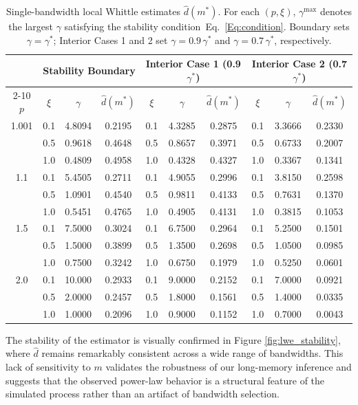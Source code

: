 \documentclass[11pt]{article}
\theoremstyle{definition}
\begin{document}
\begin{table}[t]
	\centering
	\caption{Single-bandwidth local Whittle estimates $\hat{d}(m^\ast)$.
	For each $(p,\xi)$, $\gamma^{\max}$ denotes the largest $\gamma$ satisfying
	the stability condition~Eq.~\eqref{Eq:condition}.
	Boundary sets $\gamma = \gamma^{*}$; Interior Cases 1 and 2
	set $\gamma = 0.9\,\gamma^{*}$ and $\gamma = 0.7\,\gamma^{*}$, respectively.}
	\label{tab:single_bw}
	\renewcommand{\arraystretch}{1.3}
	\begin{tabular}{c c c c | c c c | c c c}
		\hline
		& \multicolumn{3}{c|}{Stability Boundary} & \multicolumn{3}{c|}{Interior Case 1 (0.9$\gamma^{*}$)} & \multicolumn{3}{c}{Interior Case 2 (0.7$\gamma^{*}$)} \\
		\cline{2-10}
		$p$ & $\xi$ & $\gamma$ & $\hat{d}(m^\ast)$ & $\xi$ & $\gamma$ & $\hat{d}(m^\ast)$ & $\xi$ & $\gamma$ & $\hat{d}(m^\ast)$ \\
		\hline
		1.001 & 0.1 & 4.8094 & 0.2195 & 0.1 & 4.3285 & 0.2875 & 0.1 & 3.3666 & 0.2330 \\
		& 0.5 & 0.9618 & 0.4648 & 0.5 & 0.8657 & 0.3971 & 0.5 & 0.6733 & 0.2007 \\
		& 1.0 & 0.4809 & 0.4958 & 1.0 & 0.4328 & 0.4327 & 1.0 & 0.3367 & 0.1341 \\
		\hline
		1.1   & 0.1 & 5.4505 & 0.2711 & 0.1 & 4.9055 & 0.2996 & 0.1 & 3.8150 & 0.2598 \\
		& 0.5 & 1.0901 & 0.4540 & 0.5 & 0.9811 & 0.4133 & 0.5 & 0.7631 & 0.1370 \\
		& 1.0 & 0.5451 & 0.4765 & 1.0 & 0.4905 & 0.4131 & 1.0 & 0.3815 & 0.1053 \\
		\hline
		1.5   & 0.1 & 7.5000 & 0.3024 & 0.1 & 6.7500 & 0.2964 & 0.1 & 5.2500 & 0.1501 \\
		& 0.5 & 1.5000 & 0.3899 & 0.5 & 1.3500 & 0.2698 & 0.5 & 1.0500 & 0.0985 \\
		& 1.0 & 0.7500 & 0.3242 & 1.0 & 0.6750 & 0.1979 & 1.0 & 0.5250 & 0.0601 \\
		\hline
		2.0   & 0.1 & 10.000 & 0.2933 & 0.1 & 9.0000 & 0.2152 & 0.1 & 7.0000 & 0.0921 \\
		& 0.5 & 2.0000 & 0.2457 & 0.5 & 1.8000 & 0.1561 & 0.5 & 1.4000 & 0.0335 \\
		& 1.0 & 1.0000 & 0.2096 & 1.0 & 0.9000 & 0.1152 & 1.0 & 0.7000 & 0.0043 \\
		\hline
	\end{tabular}
\end{table}


The stability of the estimator is visually confirmed in Figure \ref{fig:lwe_stability}, where $\hat{d}$ remains remarkably consistent across a wide range of bandwidths. 
This lack of sensitivity to $m$ validates the robustness of our long-memory inference and suggests that the observed power-law behavior is a structural feature of the simulated process rather than an artifact of bandwidth selection.
\end{document}
